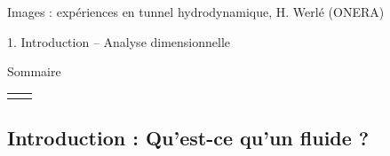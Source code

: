 \begin{frame}
\medskip
{\small \color{gray}
Images : expériences en tunnel hydrodynamique, H. Werlé (ONERA)
}

  \vspace{12mm}
  
  \begin{flushright}
    
    \Large
   	\bf
    
    1. Introduction -- Analyse dimensionnelle

  \end{flushright}

\end{frame}



\begin{frame}{Sommaire}

\small
  
\hspace*{2mm}
\begin{tabular}{cc}
  		\begin{minipage}{62mm}
  			\tableofcontents[firstsection=0]
      \vspace{15mm}
  		\end{minipage}
  		&   
  		\begin{minipage}{60cm}
		  \vspace*{-5mm}  
  		\end{minipage}
  	\end{tabular}

\vspace{0mm}

\end{frame}






\subsection{Introduction : Qu'est-ce qu'un fluide ?}

